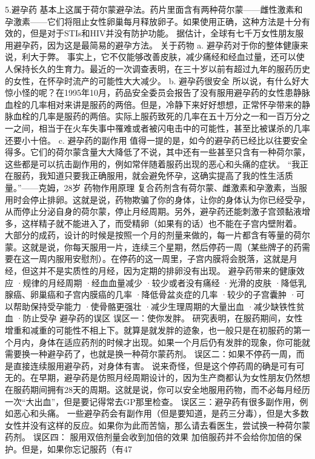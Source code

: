 \documentclass[12pt,UTF8]{ctexbook}
\begin{document}
5.避孕药
基本上这属于荷尔蒙避孕法。药片里面含有两种荷尔蒙——雌性激素和孕激素——它们将阻止女性卵巢每月释放卵子。如果使用正确，这种方法是十分有效的，但是对于STIs和HIV并没有防护功能。
据估计，全球有七千万女性朋友服用避孕药，因为这是最简易的避孕方法。
关于药物
a. 避孕药对于你的整体健康来说，利大于弊。
事实上，它不仅能够改善皮肤，减少痛经和经血过量，还可以使人保持长久的生育力。最近的一次调查表明，在三十岁以前有超过九年的服药历史的女性，在怀孕时流产的可能性大大减少。
b. 避孕药很安全
所以说，有什么好大惊小怪的呢？在1995年10月，药品安全委员会报告了没有服用避孕药的女性患静脉血栓的几率相对来讲是服药的两倍。但是，冷静下来好好想想，正常怀孕带来的静脉血栓的几率是服药的两倍。实际上服药致死的几率在五十万分之一和一百万分之一之间，相当于在火车失事中罹难或者被闪电击中的可能性，甚至比被谋杀的几率还要小十倍。
c. 避孕药的副作用
值得一提的是，如今的避孕药已经比以往要安全得多。它们的荷尔蒙含量大大降低了不说，其中还有一些甚至只含有一种荷尔蒙，这些都是可以抗击副作用的，例如常伴随着服药出现的恶心和头痛的症状。
“我正在服药，我知道只要我正确服用，就会避免怀孕，这确实提高了我的性生活质量。”——克姆，28岁
药物作用原理
复合药剂含有荷尔蒙、雌激素和孕激素，当服用时会停止排卵。这就是说，药物欺骗了你的身体，让你的身体认为你已经受孕，从而停止分泌自身的荷尔蒙，停止月经周期。另外，避孕药还能刺激子宫颈黏液增多，这样精子就不能进入了，而受精卵（如果有的话）也不能在子宫内壁附着。
大部分的成药，设计的时候是按照一个月的剂量来做的，每一片都含有等量的荷尔蒙。这就是说，你每天服用一片，连续三个星期，然后停药一周（某些牌子的药需要在这一周内服用安慰剂）。在停药的这一周里，子宫内膜将会脱落，这就是月经，但这并不是实质性的月经，因为定期的排卵没有出现。
避孕药带来的健康效应
·规律的月经周期
·经血血量减少
·较少或者没有痛经
·光滑的皮肤
·降低乳腺癌、卵巢癌和子宫内膜癌的几率
·降低骨盆炎症的几率
·较少的子宫囊肿
·可以帮助保持受孕能力
·使骨骼更强壮
·减少生理周期的大量出血
·减少缺铁性贫血
·防止受孕
避孕药的误区
误区一：使你发胖。
研究表明，在服药期间，女性增重和减重的可能性不相上下。就算是就发胖的迹象，也一般只是在初服药的第一个月内，身体在适应药剂的时候才出现。如果一个月后仍有发胖的现象，你可能就需要换一种避孕药了，也就是换一种荷尔蒙药剂。
误区二：如果不停药一周，而是直接连续服用避孕药，对身体有害。
说来奇怪，但是这个停药周的确是可有可无的。在早期，避孕药是仿照月经周期设计的，因为生产商都认为女性朋友仍然想在服药期间拥有28天的周期。这就是说，你可以安全地服用药物，而不必每月经历一次“大出血”，但是要记得常去GP那里检查。
误区三：避孕药有很多副作用，例如恶心和头痛。
一些避孕药会有副作用（但是要知道，是药三分毒），但是大多数女性并没有这样的反应。如果你为此而苦恼，那么请去看医生，尝试换一种荷尔蒙药剂。
误区四： 服用双倍剂量会收到加倍的效果
加倍服药并不会给你加倍的保护。但是，如果你忘记服药（有47%
\end{document}
